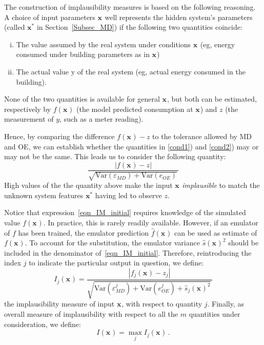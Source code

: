 \documentclass[preprint,12pt, sort&compress]{elsarticle}
\newcommand{\bd}[1]{\boldsymbol{#1}}
\newcommand{\x}[1][]{\bd{x_{#1}}}
\begin{document}
The construction of implausibility measures is based on the following reasoning. A choice of input parameters $\x$ well represents the hidden system's parameters (called $\bd{x^*}$ in Section~\ref{Subsec_MD}) if the following two quantities coincide:
\begin{enumerate}[i)]
\item \label{cond1} The value assumed by the real system under conditions $\x$ (eg, energy consumed under building parameters as in $\x$)
\item \label{cond2} The actual value y of the real system (eg, actual energy consumed in the building).
\end{enumerate}
None of the two quantities is available for general $\x$, but both can be estimated, respectively by $f(\x)$ (the model predicted consumption at $\x$) and $z$ (the measurement of $y$, such as a meter reading). 

Hence, by comparing the difference $f(\x) -z$ to the tolerance allowed by MD and OE, 
we can establish whether the quantities in \ref{cond1}) and \ref{cond2}) may or may not be the same. This leads us to consider the following quantity:
\begin{equation}\label{eqn_IM_initial}
\frac{|f(\x) - z|}{\sqrt{\text{Var}(\varepsilon_{MD}) + \text{Var}(e_{OE}) }\,}
\end{equation}
High values of the the quantity above make the input $\x$ \emph{implausible} to match the unknown system features $\bd{x^*}$ having led to observe $z$.

Notice that expression~\eqref{eqn_IM_initial} requires knowledge of the simulated value $f(\x)$. In practice, this is rarely readily available. However, if an emulator of $f$ has been trained, the emulator prediction $\hat{f}(\x)$ can be used as estimate of $f(\x)$. To account for the substitution, the emulator variance ${\hat{s}(\x)}^2$ should be included in the denominator of~\eqref{eqn_IM_initial}. Therefore, reintroducing the index $j$ to indicate the particular output in question, we define:
\begin{equation}\label{eqn_IM}
I_j(\x) = \frac{|f_j(\x) - z_j|}{\sqrt{\text{Var}(\varepsilon_{MD}^j) + \text{Var}(e_{OE}^j) +  {\hat{s}_j(\x)}^2}\,}
\end{equation}
the implausibility measure of input $\x$, with respect to quantity $j$.
Finally, as overall measure of implausibility with respect to all the $m$ quantities under consideration, we define:
\begin{equation}\label{eqn_IM_overall}
I(\x) = \max_j I_j(\x)\,.
\end{equation}
\end{document}
